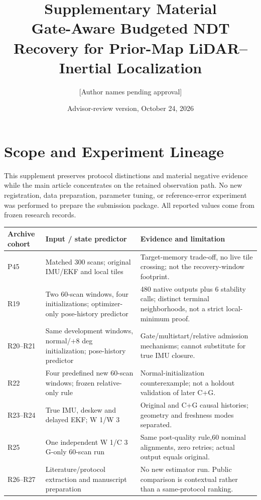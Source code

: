\documentclass[11 pt,letterpaper]{article}
\title{Supplementary Material\\Gate-Aware Budgeted NDT Recovery for Prior-Map LiDAR--Inertial Localization}
\author{[Author names pending approval]}
\date{Advisor-review version, October 24, 2026}
\begin{document}
\maketitle
\section{Scope and Experiment Lineage}
This supplement preserves protocol distinctions and material negative evidence while the main article concentrates on the retained observation path. No new registration, data preparation, parameter tuning, or reference-error experiment was performed to prepare the submission package. All reported values come from frozen research records.

\begin{table}[h]\centering\small
\begin{tabular}{p{}p{}p{}}
\toprule
Archive cohort & Input / state predictor & Evidence and limitation\\\midrule
P45 & Matched 300 scans; original IMU/EKF and local tiles & Target-memory trade-off, no live tile crossing; not the recovery-window footprint.\\
R19 & Two 60-scan windows, four initializations; optimizer-only pose-history predictor & 480 native outputs plus 6 stability calls; distinct terminal neighborhoods, not a strict local-minimum proof.\\
R20--R21 & Same development windows, normal/+8 deg initialization; pose-history predictor & Gate/multistart/relative admission mechanisms; cannot substitute for true IMU closure.\\
R22 & Four predefined new 60-scan windows; frozen relative-only rule & Normal-initialization counterexample; not a holdout validation of later C+G.\\
R23--R24 & True IMU, deskew and delayed EKF; W 1/W 3 & Original and C+G causal histories; geometry and freshness modes separated.\\
R25 & One independent W 1/C 3 G-only 60-scan run & Same post-quality rule,60 nominal alignments, zero retries; actual output equals original.\\
R26--R27 & Literature/protocol extraction and manuscript preparation & No new estimator run. Public comparison is contextual rather than a same-protocol ranking.\\
\bottomrule
\end{tabular}
\end{table}
\end{document}
